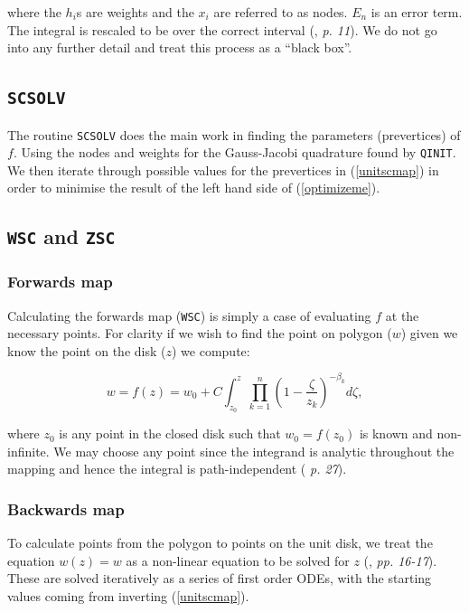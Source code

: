 \documentclass[a4paper,10pt]{amsart}
\begin{document}
where the $h_i$s are weights and the $x_i$ are referred to as nodes. $E_n$ is an error term. The integral is rescaled to be over the correct interval (\cite{trefethen}, \emph{p. 11}). We do not go into any further detail and treat this process as a ``black box''.

\subsection{\texttt{SCSOLV}}

The routine \texttt{SCSOLV} does the main work in finding the parameters (prevertices) of $f$. Using the nodes and weights for the Gauss-Jacobi quadrature found by \texttt{QINIT}. We then iterate through possible values for the prevertices in (\ref{unitscmap}) in order to minimise the result of the left hand side of (\ref{optimizeme}).

\subsection{\texttt{WSC} and \texttt{ZSC}}

\subsubsection{Forwards map}

Calculating the forwards map (\texttt{WSC}) is simply a case of evaluating $f$ at the necessary points. For clarity if we wish to find the point on polygon ($w$) given we know the point on the disk ($z$) we compute:

\begin{equation}
\label{unitscmap}
w=f(z) = w_0 + C \int_{z_0}^{z} \prod_{k=1}^{n} (1 - \frac{\zeta}{z_k})^{-\beta_k} d\zeta,
\end{equation}

where $z_0$ is any point in the closed disk such that $w_0 = f(z_0)$ is known and non-infinite. We may choose any point since the integrand is analytic throughout the mapping and hence the integral is path-independent (\cite{driscoll} \emph{p. 27}).


\subsubsection{Backwards map}

To calculate points from the polygon to points on the unit disk, we treat the equation $w(z)=w$ as a non-linear equation to be solved for $z$ (\cite{trefethen}, \emph{pp. 16-17}). These are solved iteratively as a series of first order ODEs, with the starting values coming from inverting (\ref{unitscmap}).
\end{document}
